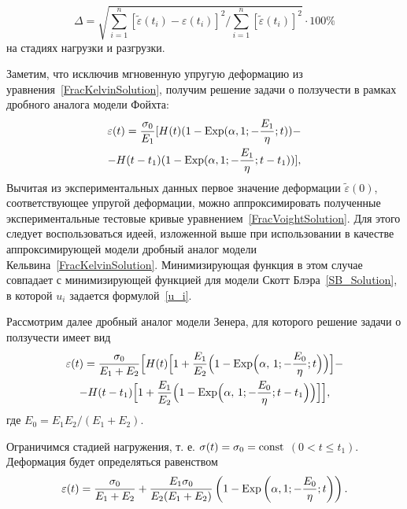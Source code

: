 \begin{equation}\label{norma}
\Delta=\sqrt{\displaystyle\sum^{n}_{i=1}\left[\tilde{\varepsilon}(t_{i})-\varepsilon(t_{i})\right]^{2}/\displaystyle\sum^{n}_{i=1}\left[\tilde{\varepsilon}(t_{i})\right]^{2}}\cdot 100\%
\end{equation}
на стадиях нагрузки и разгрузки.

Заметим, что исключив мгновенную упругую деформацию из уравнения~\eqref{FracKelvinSolution}, получим решение задачи о ползучести в рамках дробного аналога модели Фойхта:
\begin{multline}
\label{FracVoightSolution}
\varepsilon(t)=\frac{\sigma_{0}}{E_{1}}[H(t)(1-{\rm Exp}(\alpha,1;-\frac{E_{1}}{\eta};t))-
\\
-H(t-t_{1})(1-{\rm Exp}(\alpha,1;-\frac{E_{1}}{\eta};t-t_{1}))],
\end{multline}
Вычитая из экспериментальных данных первое значение деформации $\tilde{\varepsilon}(0)$, соответствующее упругой деформации, можно аппроксимировать полученные экспериментальные тестовые кривые уравнением~\eqref{FracVoightSolution}. Для этого следует воспользоваться идеей, изложенной выше при использовании в качестве аппроксимирующей модели дробный аналог модели Кельвина~\eqref{FracKelvinSolution}. Минимизирующая функция в этом случае совпадает с минимизирующей функцией для модели Скотт Блэра~\eqref{SB_Solution}, в которой $u_{i}$ задается формулой~\eqref{u_i}.

Рассмотрим далее дробный аналог модели Зенера, для которого решение задачи о ползучести имеет вид~\cite{OgoRadUng16}
\begin{multline}
\label{FracZenerSolution}
\varepsilon(t)=\frac{\sigma_{0}}{E_{1}+E_{2}}\Bigl[H(t)\Bigl[1+\frac{E_{1}}{E_{2}}\Bigl(1-{\rm Exp}\Bigl(\alpha,\,1;-\frac{E_{0}}{\eta};t\Bigl)\Bigr)\Bigr]-
\\
-H(t-t_{1})\Bigl[1+\frac{E_{1}}{E_{2}}\Bigr(1-{\rm Exp}\Bigl(\alpha,\,1;-\frac{E_{0}}{\eta};t-t_{1}\Bigl)\Bigr)\Bigr]\Bigr],
\end{multline}
где $E_{0}=E_{1}E_{2}/(E_{1}+E_{2})$.

Ограничимся стадией нагружения, т. е. $\sigma(t)=\sigma_{0}=\rm const$ $(0<t\leq t_{1})$. Деформация будет определяться равенством
\begin{equation} \label{FracZenerSolution2}
\varepsilon(t)=\frac{\sigma_{0}}{E_{1}+E_{2}}+\frac{E_{1}\sigma_{0}}{E_{2}(E_{1}+E_{2})}\left(1-{\rm Exp}\left(\alpha,1;-\frac{E_{0}}{\eta};t\right)\right).
\end{equation}

